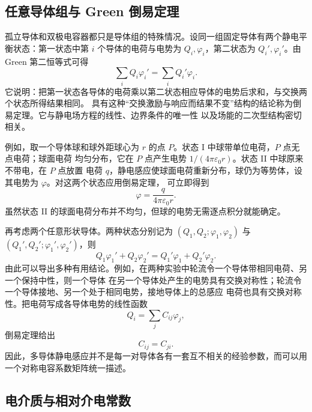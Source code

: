 \subsection*{任意导体组与 Green 倒易定理}

孤立导体和双极电容器都只是导体组的特殊情况。设同一组固定导体有两个静电平衡状态：第一状态中第 $i$
个导体的电荷与电势为 $Q_i,\varphi_i$，第二状态为 $Q_i',\varphi_i'$。由 Green 第二恒等式可得
\begin{equation}
  \boxed{\sum_iQ_i\varphi_i'=\sum_iQ_i'\varphi_i}.
\end{equation}
它说明：把第一状态各导体的电荷乘以第二状态相应导体的电势后求和，与交换两个状态所得结果相同。
具有这种“交换激励与响应而结果不变”结构的结论称为倒易定理。它与静电场方程的线性、边界条件的唯一性
以及场能的二次型结构密切相关。

\reciprocitySphereDiagram

例如，取一个导体球和球外距球心为 $r$ 的点 $P$。状态 I 中球带单位电荷，$P$ 点无点电荷；球面电荷
均匀分布，它在 $P$ 点产生电势 $1/(4\pi\varepsilon_0r)$。状态 II 中球原来不带电，在 $P$ 点放置
电荷 $q$，静电感应使球面电荷重新分布，球仍为等势体，设其电势为 $\varphi$。对这两个状态应用倒易定理，
可立即得到
\begin{equation}
  \boxed{\varphi=\frac{q}{4\pi\varepsilon_0r}}.
\end{equation}
虽然状态 II 的球面电荷分布并不均匀，但球的电势无需逐点积分就能确定。

\reciprocityConductorsDiagram

再考虑两个任意形状导体。两种状态分别记为
$(Q_1,Q_2;\varphi_1,\varphi_2)$ 与
$(Q_1',Q_2';\varphi_1',\varphi_2')$，则
\begin{equation}
  Q_1\varphi_1'+Q_2\varphi_2'
  =Q_1'\varphi_1+Q_2'\varphi_2.
\end{equation}
由此可以导出多种有用结论。例如，在两种实验中轮流令一个导体带相同电荷、另一个保持中性，则一个导体
在另一个导体处产生的电势具有交换对称性；轮流令一个导体接地、另一个处于相同电势，接地导体上的总感应
电荷也具有交换对称性。把电荷写成各导体电势的线性函数
\begin{equation}
  Q_i=\sum_jC_{ij}\varphi_j,
\end{equation}
倒易定理给出
\begin{equation}
  \boxed{C_{ij}=C_{ji}}.
\end{equation}
因此，多导体静电感应并不是每一对导体各有一套互不相关的经验参数，而可以用一个对称电容系数矩阵统一描述。

\subsection*{电介质与相对介电常数}

